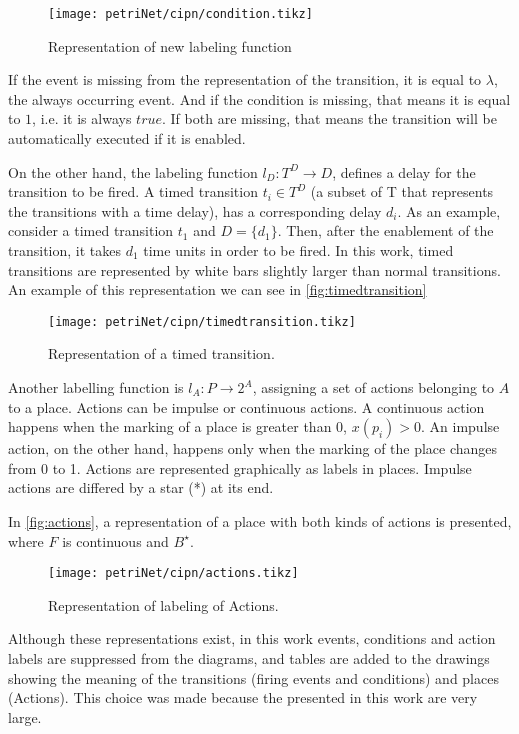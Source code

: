 \begin{figure}[H]
  \centering \texttt{[image: petriNet/cipn/condition.tikz]}
  \caption{Representation of new labeling function}
  \label{fig:condition}
\end{figure}

If the event is missing from the representation of the transition, it is equal
to $\lambda$, the always occurring event. And if the condition is missing, that means it is
equal to $1$, i.e. it is always $true$. If both are missing, that means the
transition will be automatically executed if it is enabled. 

On the other hand, the labeling function $l_D : T^D \rightarrow D$, defines a delay for the
transition to be fired. A timed transition $t_i \in T^D$ (a subset of T
that represents the transitions with a time delay), has a corresponding delay
$d_i$. As an example, consider a timed transition $t_1$ and $D=\{d_1\}$. Then, after the
enablement of the transition, it takes $d_1$ time units in order to be fired. In
this work, timed transitions are represented by white bars slightly larger than normal
transitions. An example of this representation we can see in \autoref{fig:timedtransition}

\begin{figure}[H]
  \centering \texttt{[image: petriNet/cipn/timedtransition.tikz]}
  \caption{Representation of a timed transition.}
  \label{fig:timedtransition}
\end{figure}
Another labelling function is $l_A : P\rightarrow 2^A$,
assigning a set of actions belonging to $A$ to a place. Actions can be impulse
or continuous actions. A
continuous action happens when the marking of a place is greater than 0,
$x(p_i)>0$. An impulse action, on the other hand, happens only when the marking of
the place changes from 0 to 1. 
Actions are represented graphically as labels in places. Impulse actions are
differed by a star (*) at its end.

In \autoref{fig:actions}, a representation of a place with both kinds of actions
is presented, where $F$ is continuous and $B^\star$.
\begin{figure}[H]
  \centering \texttt{[image: petriNet/cipn/actions.tikz]}
  \caption{Representation of labeling of Actions.}
  \label{fig:actions}
\end{figure}

Although these representations exist, in this work events, conditions and
action labels are suppressed from the diagrams, and tables are added to the drawings
showing the meaning of the transitions (firing events and conditions) and places
(Actions). This choice was made because the \CIPNs{}
presented in this work are very
large.

